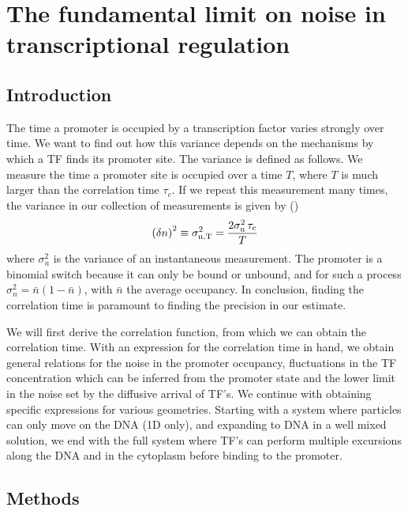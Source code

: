 \section{The fundamental limit on noise in transcriptional regulation}

\subsection{Introduction}
The time a promoter is occupied by a transcription factor varies strongly over time. We want to find out how this variance depends on the mechanisms by which a TF finds its promoter site. The variance is defined as follows. We measure the time a promoter site is occupied over a time $T$, where $T$ is much larger than the correlation time $\tau_c$. If we repeat this measurement many times, the variance in our collection of measurements is given by ()
\begin{equation}
 \left( \delta n \right)^2 \equiv \sigma_{\rm n, T}^2 = \frac{2 \sigma_{\rm n}^2 \,\tau_{\rm c}}{T}
 \elabel{std_devT}
\end{equation}
where $\sigma_n^2$ is the variance of an instantaneous measurement. The promoter is a binomial switch because it can only be bound or unbound, and for such a process $\sigma^2_n = \bar{n}(1-\bar{n})$, with $\bar{n}$ the average occupancy. In conclusion, finding the correlation time is paramount to finding the precision in our estimate.

We will first derive the correlation function, from which we can obtain the correlation time. With an expression for the correlation time in hand, we obtain general relations for the noise in the promoter occupancy, fluctuations in the TF concentration which can be inferred from the promoter state and the lower limit in the noise set by the diffusive arrival of TF's. We continue with obtaining specific expressions for various geometries. Starting with a system where particles can only move on the DNA (1D only), and expanding to DNA in a well mixed solution, we end with the full system where TF's can perform multiple excursions along the DNA and in the cytoplasm before binding to the promoter.


\subsection{Methods}

